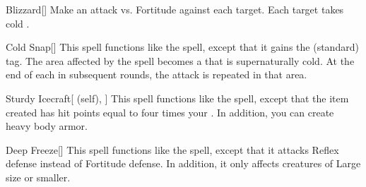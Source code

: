 \lowercase{\hypertarget{spell:Blizzard}{}}\label{spell:Blizzard}
\begin{freeability}[\nth{2}]{\hypertarget{spell:Blizzard}{Blizzard}}[]
Make an attack vs. Fortitude against each target.
\hit Each target takes cold .
\end{freeability}
\vspace{0.25em}



\lowercase{\hypertarget{spell:Cold Snap}{}}\label{spell:Cold Snap}
\begin{freeability}[\nth{2}]{\hypertarget{spell:Cold Snap}{Cold Snap}}[]
This spell functions like the  spell, except that it gains the  (standard) tag.
The area affected by the spell becomes a  that is supernaturally cold.
At the end of each  in subsequent rounds, the attack is repeated in that area.
\end{freeability}
\vspace{0.25em}



\lowercase{\hypertarget{spell:Sturdy Icecraft}{}}\label{spell:Sturdy Icecraft}
\begin{attuneability}[\nth{2}]{\hypertarget{spell:Sturdy Icecraft}{Sturdy Icecraft}}[ (self), ]
This spell functions like the  spell, except that the item created has hit points equal to four times your .
In addition, you can create heavy body armor.
\end{attuneability}
\vspace{0.25em}



\lowercase{\hypertarget{spell:Deep Freeze}{}}\label{spell:Deep Freeze}
\begin{freeability}[\nth{3}]{\hypertarget{spell:Deep Freeze}{Deep Freeze}}[]
This spell functions like the  spell, except that it attacks Reflex defense instead of Fortitude defense.
In addition, it only affects creatures of Large size or smaller.
\end{freeability}
\vspace{0.25em}



